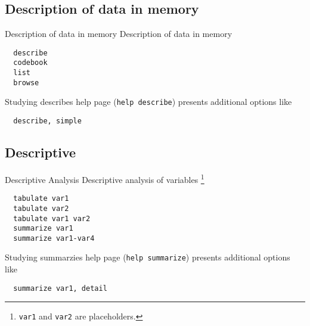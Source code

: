 \subsection{Description of data in memory}
\begin{frame}[fragile]{Description of data in memory}
Description of data in memory      

  \begin{lstlisting}
  describe
  codebook
  list
  browse
  \end{lstlisting}
  
Studying describes help page (\texttt{help describe}) presents additional options like
  \begin{lstlisting}
  describe, simple
  \end{lstlisting}
  

\end{frame}

\subsection{Descriptive}
\begin{frame}[fragile]{Descriptive Analysis}
Descriptive analysis of variables \footnote{\texttt{var1} and \texttt{var2} are placeholders.}

  
  \begin{lstlisting}
  tabulate var1
  tabulate var2
  tabulate var1 var2
  summarize var1
  summarize var1-var4
  \end{lstlisting}

Studying summarzies help page (\texttt{help summarize}) presents additional options like
  \begin{lstlisting}
  summarize var1, detail
  \end{lstlisting}

\end{frame}